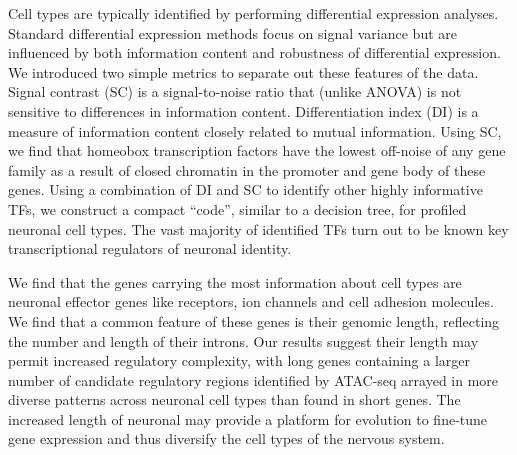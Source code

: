 Cell types are typically identified by performing differential expression analyses. Standard differential expression methods focus on signal variance but are influenced by both information content and robustness of differential expression. We introduced two simple metrics to separate out these features of the data. Signal contrast (SC) is a signal-to-noise ratio that (unlike ANOVA) is not sensitive to differences in information content. Differentiation index (DI) is a measure of information content closely related to mutual information. Using SC, we find that homeobox transcription factors have the lowest off-noise of any gene family as a result of closed chromatin in the promoter and gene body of these genes. Using a combination of DI and SC to identify other highly informative TFs, we construct a compact “code”, similar to a decision tree, for profiled neuronal cell types. The vast majority of identified TFs turn out to be known key transcriptional regulators of neuronal identity.

We find that the genes carrying the most information about cell types are neuronal effector genes like receptors, ion channels and cell adhesion molecules. We find that a common feature of these genes is their genomic length, reflecting the number and length of their introns. %
Our results suggest their length may permit increased regulatory complexity, with long genes containing a larger number of candidate regulatory regions identified by ATAC-seq arrayed in more diverse patterns across neuronal cell types than found in short genes. The increased length of neuronal may provide a platform for evolution to fine-tune gene expression and thus diversify the cell types of the nervous system.

